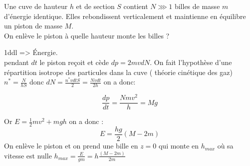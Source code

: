\begin{Exercise}[title=]
	Une cuve de hauteur $h$ et de section $S$ contient $N\ggg 1$ billes de masse
    $m$ d'énergie identique. Elles rebondissent verticalement et maintienne en
    équilibre un piston de masse $M$.\\
    On enlève le piston à quelle hauteur monte les billes ?
\end{Exercise}
\begin{Answer}
	1ddl => Énergie.\\
	pendant $dt$ le piston reçoit et cède $dp = 2mv dN$.
	On fait l'hypothèse d'une répartition isotrope des particules dans la cuve (
    théorie cinétique des gaz) $n^* = \frac{N}{hS}$ donc $dN = \frac{n^*v dt
      S}{2}=\frac{Nvdt}{2h}$ on a donc:

	\[\frac{dp}{dt} = \frac{Nmv^2}{h} = Mg\]

	Or $E = \frac{1}{2}mv^2 + mgh $ on a donc :
	\[ E = \frac{hg}{2}(M-2m)\]
	On enlève le piston et on prend une bille en $z=0$ qui monte en $h_{max}$ où
    sa vitesse est nulle $h_{max}= \frac{E}{gm} = h\frac{(M-2m)}{2m}$
\end{Answer}
